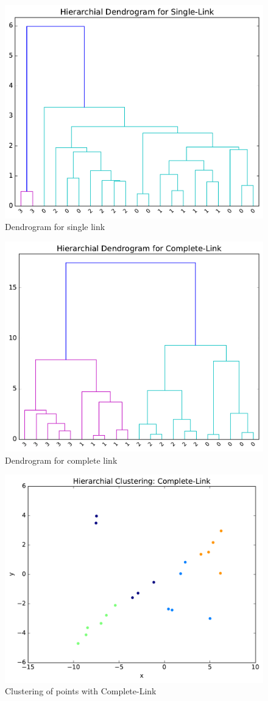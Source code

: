 \documentclass[11pt]{article}
\begin{document}
\begin{figure}[H]
\centering
\includegraphics[width=.75\textwidth]{Single-Link_dendro.pdf}
\caption{Dendrogram for single link}
\end{figure}

\begin{figure}[H]
\centering
\includegraphics[width=.75\textwidth]{Complete-Link_dendro.pdf}
\caption{Dendrogram for complete link}
\end{figure}

\begin{figure}[H]
\centering
\includegraphics[width=.75\textwidth]{Complete-Link.pdf}
\caption{Clustering of points with Complete-Link}
\end{figure}
\end{document}
